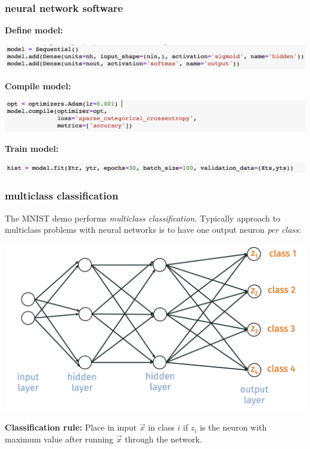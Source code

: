 \documentclass[handout,compress]{beamer}
\begin{document}
	\begin{frame}
		\frametitle{neural network software}
		\small
		\textbf{Define model:}
		\begin{center}
			\includegraphics[width=\textwidth]{define_model.png}
		\end{center}
		\vspace{-1em}
		
		\textbf{Compile model:}
		\begin{center}
		\includegraphics[width=\textwidth]{compile_model.png}
		\end{center}
		\vspace{-1em}
		
		\textbf{Train model:}
		\begin{center}
		\includegraphics[width=\textwidth]{runmodel.png}
		\end{center}
		\vspace{-1em}
	\end{frame}

	\begin{frame}
	\frametitle{multiclass classification}
	The MNIST demo performs \emph{multiclass classification.} Typically approach to multiclass problems with neural networks is to have one output neuron \emph{per class}:
	\begin{center}
		\includegraphics[width=.8\textwidth]{multiclass_network.png}
	\end{center}
	
	\vspace{-1.5em}
	\textbf{Classification rule:} Place in input $\vec{x}$ in class $i$ if $z_i$ is the neuron with maximum value after running $\vec{x}$ through the network.
	\end{frame}
\end{document}
